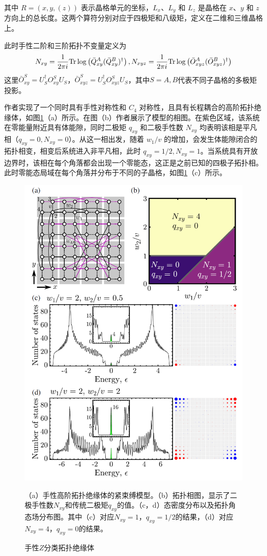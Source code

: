 其中 \( R = (x, y,(z)) \) 表示晶格单元的坐标，\( L_x \)、\( L_y \) 和 \( L_z \) 是晶格在 \( x \)、\( y \) 和 \( z \) 方向上的总长度。这两个算符分别对应于四极矩和八级矩，定义在二维和三维晶格上。

此时手性二阶和三阶拓扑不变量定义为
\begin{equation}
N_{xy} = \frac{1}{2\pi i} \mathrm{Tr} \log \left( \bar{Q}_{xy}^A (\bar{Q}_{xy}^B)^\dagger \right), \\
N_{xyz} = \frac{1}{2\pi i} \mathrm{Tr} \log \left( \bar{O}_{xyz}^A (\bar{O}_{xyz}^B)^\dagger \right)
\end{equation}
这里$\bar{O}_{xy}^S = U_S^\dagger O_{xy}^SU_S$，$\bar{O}_{xyz}^S = U_S^\dagger O_{xyz}^SU_S$，其中$S=A,B$代表不同子晶格的多极矩投影。

作者实现了一个同时具有手性对称性和 \( C_4 \) 对称性，且具有长程耦合的高阶拓扑绝缘体，如图\ref{fig:CHOTI}（a）所示。在图（b）作者展示了模型的相图。在紫色区域，该系统在零能量附近具有体能隙，同时二极矩 \( q_{xy} \) 和二极手性数 \( N_{xy} \) 均表明该相是平凡相（\( q_{xy} = 0, N_{xy} = 0 \)）。从这一相出发，随着 \( w_1/v \) 的增加，会发生体能隙闭合的拓扑相变，相变后系统进入非平凡相，此时 \( q_{xy} = 1/2, N_{xy} = 1 \)。当系统具有开放边界时，该相在每个角落都会出现一个零能态，这正是之前已知的四极子拓扑相。此时零能态局域在每个角落并分布于不同的子晶格，如图\ref{fig:CHOTI}（c）所示。

\begin{figure}
    \centering
    \includegraphics[width=0.5\linewidth]{figure/Introduction/CHOTI.png}
    \caption{手性$Z$分类拓扑绝缘体}（a）手性高阶拓扑绝缘体的紧束缚模型。（b）拓扑相图，显示了二极手性数$N_{xy}$和传统二极矩$q_{xy}$的值。（c，d）态密度分布以及拓扑角态场分布图。其中（c）对应$N_{xy}=1$，$q_{xy}=1/2$的结果，（d）对应$N_{xy}=4$，$q_{xy}=0$的结果。
    \label{fig:CHOTI}
\end{figure}

